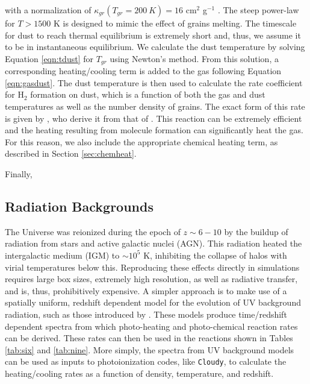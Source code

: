 with a normalization of $\kappa_{gr}(T_{gr} = 200~K) = 16$ cm$^{2}$ g$^{-1}$
\citep{1994ApJ...421..615P, 2000ApJ...534..809O}.  The steep power-law
for $T > 1500$ K is designed to mimic the effect of grains melting.
The timescale for dust to reach thermal equilibrium is extremely
short and, thus, we assume it to be in instantaneous equilibrium.  We
calculate the dust temperature by solving Equation \ref{eqn:tdust} for
$T_{gr}$ using Newton's method.  From this solution, a corresponding
heating/cooling term is added to the gas following Equation
\ref{eqn:gasdust}.  The dust temperature is then used to calculate the
rate coefficient for H$_{2}$ formation on dust, which is a function of
both the gas and dust temperatures as well as the number density of
grains.  The exact form of this rate is given by
\citet{2000ApJ...534..809O}, who derive it from that of
\citet{1985ApJ...291..722T}.  This reaction can be extremely
efficient and the heating resulting from molecule formation can
significantly heat the gas.  For this reason, we also include the
appropriate chemical heating term, as described in Section
\ref{sec:chemheat}.

Finally, 

\subsection{Radiation Backgrounds}
\label{section:radback}

The Universe was reionized during the epoch of $z \sim 6-10$ by the
buildup of radiation from stars and active galactic nuclei (AGN).
This radiation heated the intergalactic medium (IGM) to $\sim10^{5}$
K, inhibiting the collapse of halos with virial temperatures below
this.  Reproducing these effects directly in simulations requires 
large box sizes, extremely high resolution, as well as radiative
transfer, and is, thus, prohibitively expensive.  A simpler approach
is to make use of a spatially uniform, redshift dependent model for
the evolution of UV background radiation, such as those introduced by
\citet{1996ApJ...461...20H}.  These models produce time/redshift
dependent spectra from which photo-heating and photo-chemical reaction
rates can be derived.  These rates can then be used in the reactions
shown in Tables \ref{tab:six} and \ref{tab:nine}.  More simply, the
spectra from UV background models can be used as inputs to
photoionization codes, like \texttt{Cloudy}, to calculate the
heating/cooling rates as a function of density, temperature, and
redshift.

